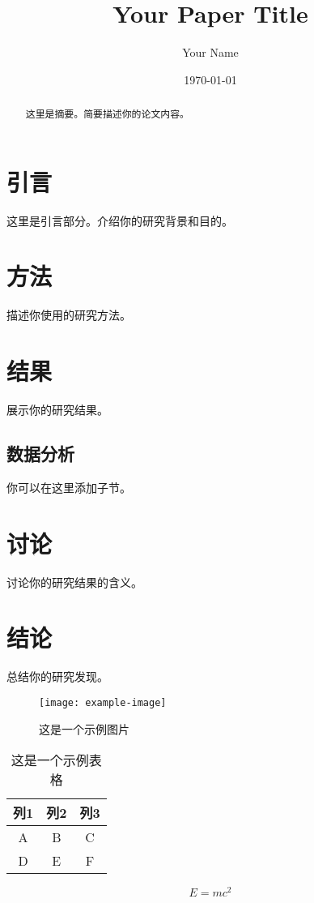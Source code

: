 \documentclass[12pt, a4paper]{article}
\title{Your Paper Title}
\author{Your Name}
\date{\today}
\begin{document}
\maketitle

\begin{abstract}
这里是摘要。简要描述你的论文内容。
\end{abstract}

\section{引言}
这里是引言部分。介绍你的研究背景和目的。

\section{方法}
描述你使用的研究方法。

\section{结果}
展示你的研究结果。

\subsection{数据分析}
你可以在这里添加子节。

\section{讨论}
讨论你的研究结果的含义。

\section{结论}
总结你的研究发现。

\begin{figure}[h]
    \centering
    \texttt{[image: example-image]}
    \caption{这是一个示例图片}
    \label{fig:example}
\end{figure}

\begin{table}[h]
    \centering
    \begin{tabular}{|c|c|c|}
        \hline
        列1 & 列2 & 列3 \\
        \hline
        A & B & C \\
        D & E & F \\
        \hline
    \end{tabular}
    \caption{这是一个示例表格}
    \label{tab:example}
\end{table}

\begin{equation}
    E = mc^2
    \label{eq:einstein}
\end{equation}


\end{document}
